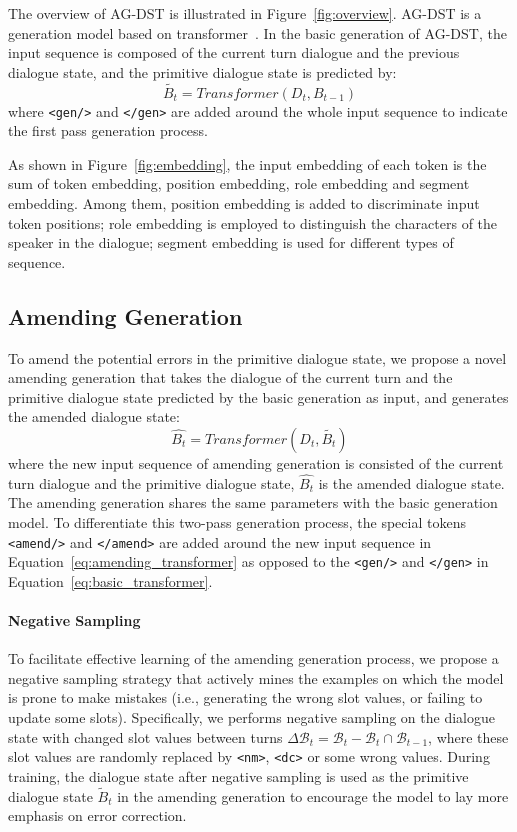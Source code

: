 \documentclass[11pt]{article}
\begin{document}
The overview of AG-DST is illustrated in Figure~\ref{fig:overview}. AG-DST is a generation model based on transformer~\citep{vaswani2017attention,li2019unified}. In the basic generation of AG-DST, the input sequence is composed of the current turn dialogue and the previous dialogue state, and the primitive dialogue state is predicted by:
\begin{equation}
    \tilde{B_t}=Transformer(D_t,B_{t-1}) \label{eq:basic_transformer}
\end{equation}
where \texttt{<gen/>} and \texttt{</gen>} are added around the whole input sequence to indicate the first pass generation process.

As shown in Figure~\ref{fig:embedding}, the input embedding of each token is the sum of token embedding, position embedding, role embedding and segment embedding. Among them, position embedding is added to discriminate input token positions; role embedding is employed to distinguish the characters of the speaker in the dialogue; segment embedding is used for different types of sequence.


\subsection{Amending Generation}\label{sec:amending_generation}

To amend the potential errors in the primitive dialogue state, we propose a novel amending generation that takes the dialogue of the current turn and the primitive dialogue state predicted by the basic generation as input, and generates the amended dialogue state:
\begin{equation}
    \hat{B_t}=Transformer(D_t,\tilde{B_t}) \label{eq:amending_transformer}
\end{equation}
where the new input sequence of amending generation is consisted of the current turn dialogue and the primitive dialogue state, $\hat{B_t}$ is the amended dialogue state. The amending generation shares the same parameters with the basic generation model. To differentiate this two-pass generation process, the special tokens \texttt{<amend/>} and \texttt{</amend>} are added around the new input sequence in Equation~\ref{eq:amending_transformer} as opposed to the \texttt{<gen/>} and \texttt{</gen>} in Equation~\ref{eq:basic_transformer}.


\paragraph{Negative Sampling} 
To facilitate effective learning of the amending generation process, we propose a negative sampling strategy that actively mines the examples on which the model is prone to make mistakes (i.e., generating the wrong slot values, or failing to update some slots).
Specifically, we performs negative sampling on the dialogue state with changed slot values between turns $\Delta \mathcal{B}_t=\mathcal{B}_t-\mathcal{B}_t\cap \mathcal{B}_{t-1}$, where these slot values are randomly replaced by \texttt{<nm>}, \texttt{<dc>} or some wrong values. 
During training, the dialogue state after negative sampling is used as the primitive dialogue state $\tilde{B}_t$ in the amending generation to encourage the model to lay more emphasis on error correction.
\end{document}
